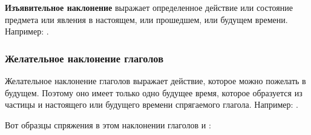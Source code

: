 \documentclass[11pt,a4paper,oneside]{memoir}
\begin{document}
\textbf{Изъявительное наклонение} выражает определенное действие или
состояние предмета или явления в настоящем, или прошедшем, или
будущем времени. Например: {}.

\subsubsection{Желательное наклонение глаголов}

Желательное наклонение глаголов выражает действие, которое можно
пожелать в будущем. Поэтому оно имеет только одно будущее время,
которое образуется из частицы {} и настоящего или будущего
времени спрягаемого глагола. Например: {}.

Вот образцы спряжения в этом наклонении глаголов {} и
{}:
\end{document}
